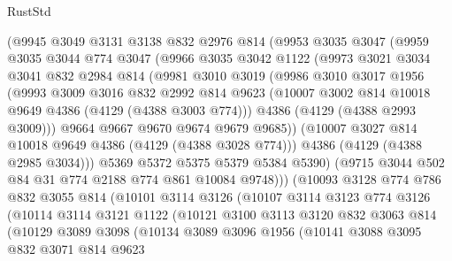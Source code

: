\begin{lexlean}{RustStd}
\begin{coremodule}
{\begin{coremodule}
{{{{{{{{{{{{{{        (@9945
          @3049
          @3131
          @3138
          @832
          @2976
          @814
          (@9953
            @3035
            @3047
            (@9959
              @3035
              @3044
              @774
              @3047
              (@9966
                @3035
                @3042
                @1122
                (@9973
                  @3021
                  @3034
                  @3041
                  @832
                  @2984
                  @814
                  (@9981
                    @3010
                    @3019
                    (@9986
                      @3010
                      @3017
                      @1956
                      (@9993
                        @3009
                        @3016
                        @832
                        @2992
                        @814
                        @9623
                        (@10007 @3002 @814 @10018 @9649 @4386 (@4129 (@4388 @3003 @774)))
                        @4386
                        (@4129 (@4388 @2993 @3009)))
                      @9664
                      @9667
                      @9670
                      @9674
                      @9679
                      @9685))
                  (@10007 @3027 @814 @10018 @9649 @4386 (@4129 (@4388 @3028 @774)))
                  @4386
                  (@4129 (@4388 @2985 @3034)))
                @5369
                @5372
                @5375
                @5379
                @5384
                @5390)
              (@9715 @3044 @502 @84 @31 @774 @2188 @774 @861 @10084 @9748)))
          (@10093
            @3128
            @774
            @786
            @832
            @3055
            @814
            (@10101
              @3114
              @3126
              (@10107
                @3114
                @3123
                @774
                @3126
                (@10114
                  @3114
                  @3121
                  @1122
                  (@10121
                    @3100
                    @3113
                    @3120
                    @832
                    @3063
                    @814
                    (@10129
                      @3089
                      @3098
                      (@10134
                        @3089
                        @3096
                        @1956
                        (@10141
                          @3088
                          @3095
                          @832
                          @3071
                          @814
                          @9623
}}}}}}}}}}}}}}
\end{coremodule}}
\end{coremodule}
\end{lexlean}
